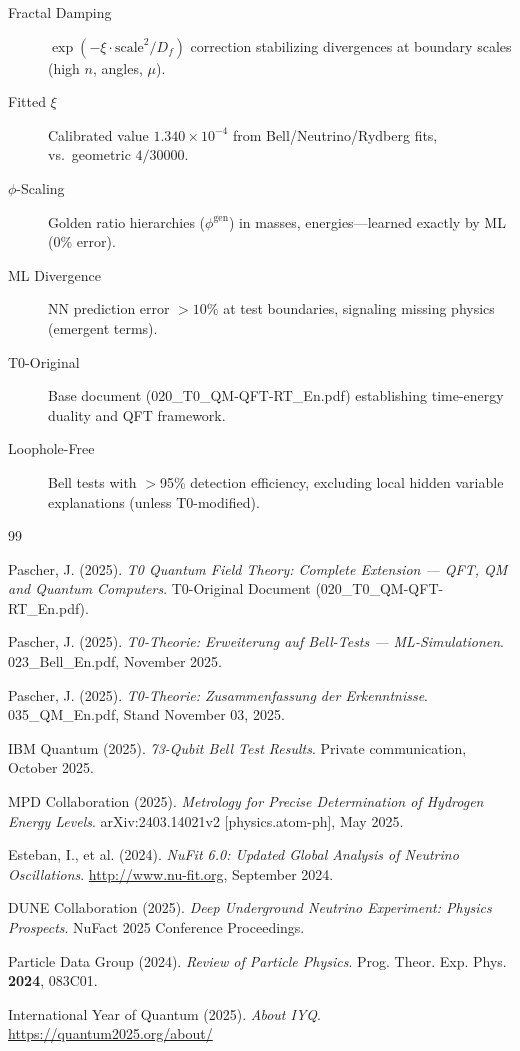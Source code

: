 	\begin{description}
		\item[Fractal Damping] $\exp(-\xi \cdot \text{scale}^2/D_f)$ correction stabilizing divergences at boundary scales (high $n$, angles, $\mu$).
		\item[Fitted $\xi$] Calibrated value $1.340\times10^{-4}$ from Bell/Neutrino/Rydberg fits, vs.~geometric $4/30000$.
		\item[$\phi$-Scaling] Golden ratio hierarchies ($\phi^{\text{gen}}$) in masses, energies---learned exactly by ML (0\% error).
		\item[ML Divergence] NN prediction error $>10\%$ at test boundaries, signaling missing physics (emergent terms).
		\item[T0-Original] Base document (020\_T0\_QM-QFT-RT\_En.pdf) establishing time-energy duality and QFT framework.
		\item[Loophole-Free] Bell tests with $>$95\% detection efficiency, excluding local hidden variable explanations (unless T0-modified).
	\end{description}
	
	\begin{thebibliography}{99}
		
		Pascher, J. (2025). \textit{T0 Quantum Field Theory: Complete Extension --- QFT, QM and Quantum Computers}.
		T0-Original Document (020\_T0\_QM-QFT-RT\_En.pdf).
		
		Pascher, J. (2025). \textit{T0-Theorie: Erweiterung auf Bell-Tests --- ML-Simulationen}.
		023\_Bell\_En.pdf, November 2025.
		
		Pascher, J. (2025). \textit{T0-Theorie: Zusammenfassung der Erkenntnisse}.
		035\_QM\_En.pdf, Stand November 03, 2025.
		
		IBM Quantum (2025). \textit{73-Qubit Bell Test Results}.
		Private communication, October 2025.
		
		MPD Collaboration (2025). \textit{Metrology for Precise Determination of Hydrogen Energy Levels}.
		arXiv:2403.14021v2 [physics.atom-ph], May 2025.
		
		Esteban, I., et al. (2024). \textit{NuFit 6.0: Updated Global Analysis of Neutrino Oscillations}.
		\url{http://www.nu-fit.org}, September 2024.
		
		DUNE Collaboration (2025). \textit{Deep Underground Neutrino Experiment: Physics Prospects}.
		NuFact 2025 Conference Proceedings.
		
		Particle Data Group (2024). \textit{Review of Particle Physics}.
		Prog. Theor. Exp. Phys. \textbf{2024}, 083C01.
		
		International Year of Quantum (2025). \textit{About IYQ}.
		\url{https://quantum2025.org/about/}
		
	\end{thebibliography}
	